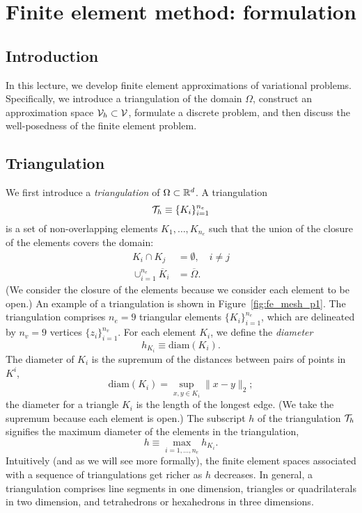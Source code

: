 \chapter{Finite element method: formulation}

\disclaimer

\section{Introduction}
In this lecture, we develop finite element approximations of variational problems.  Specifically, we introduce a triangulation of the domain $\Omega$, construct an approximation space $\mathcal{V}_h \subset \mathcal{V}$, formulate a discrete problem, and then discuss the well-posedness of the finite element problem.

\section{Triangulation}
We first introduce a \emph{triangulation} of $\Omega \subset \mathbb{R}^d$.  A triangulation
\begin{equation*}
  \mathcal{T}_h \equiv \{ K_i \}_{i=1}^{n_e}
\end{equation*}
is a set of non-overlapping elements $K_1, \dots, K_{n_e}$ such that the union of the closure of the elements covers the domain:
\begin{align*}
  K_i \cap K_j &= \emptyset,  \quad i \neq j \\
  \cup_{i=1}^{n_e} \overline K_i &= \overline \Omega.
\end{align*}
(We consider the closure of the elements because we consider each element to be open.) An example of a triangulation is shown in Figure~\ref{fig:fe_mesh_p1}. The triangulation comprises $n_e = 9$ triangular elements $\{K_i\}_{i=1}^{n_e}$, which are delineated by $n_v = 9$ vertices $\{z_i\}_{i=1}^{n_v}$. For each element $K_i$, we define the \emph{diameter}
\begin{equation*}
  h_{K_i} \equiv \text{diam}(K_i).
\end{equation*}
The diameter of $K_i$ is the supremum of the distances between pairs of points in $K^i$,
\begin{equation*}
  \text{diam}(K_i) = \sup_{x,y \in K_i} \| x - y \|_2;
\end{equation*}
the diameter for a triangle $K_i$ is the length of the longest edge. (We take the supremum because each element is open.) The subscript $h$ of the triangulation $\mathcal{T}_h$ signifies the maximum diameter of the elements in the triangulation,
\begin{equation*}
  h \equiv \max_{i = 1,\dots,n_e} h_{K_i}.
\end{equation*}
  Intuitively (and as we will see more formally), the finite element spaces associated with a sequence of triangulations get richer as $h$ decreases.  In general, a triangulation comprises line segments in one dimension, triangles or quadrilaterals in two dimension, and tetrahedrons or hexahedrons in three dimensions.


